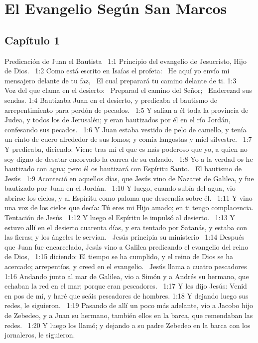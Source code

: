 \chapter{El Evangelio Según  San Marcos}
\section*{Capítulo 1}
Predicación de Juan el Bautista   
1:1 Principio del evangelio de Jesucristo, Hijo de Dios.  
1:2 Como está escrito en Isaías el profeta:  
He aquí yo envío mi mensajero delante de tu faz,  
El cual preparará tu camino delante de ti. 
1:3    Voz del que clama en el desierto:  
Preparad el camino del Señor;  
Enderezad sus sendas. 
1:4 Bautizaba Juan en el desierto, y predicaba el bautismo de arrepentimiento para perdón de pecados.  
1:5 Y salían a él toda la provincia de Judea, y todos los de Jerusalén; y eran bautizados por él en el río Jordán, confesando sus pecados.  
1:6 Y Juan estaba vestido de pelo de camello, y tenía un cinto de cuero alrededor de sus lomos;  y comía langostas y miel silvestre.  
1:7 Y predicaba, diciendo: Viene tras mí el que es más poderoso que yo, a quien no soy digno de desatar encorvado la correa de su calzado.  
1:8 Yo a la verdad os he bautizado con agua; pero él os bautizará con Espíritu Santo.  
El bautismo de Jesús  
1:9 Aconteció en aquellos días, que Jesús vino de Nazaret de Galilea, y fue bautizado por Juan en el Jordán.  
1:10 Y luego, cuando subía del agua, vio abrirse los cielos, y al Espíritu como paloma que descendía sobre él.  
1:11 Y vino una voz de los cielos que decía: Tú eres mi Hijo amado; en ti tengo complacencia. 
Tentación de Jesús  
1:12 Y luego el Espíritu le impulsó al desierto.  
1:13 Y estuvo allí en el desierto cuarenta días, y era tentado por Satanás, y estaba con las fieras; y los ángeles le servían.  
Jesús principia su ministerio   
1:14 Después que Juan fue encarcelado, Jesús vino a Galilea predicando el evangelio del reino de Dios,  
1:15 diciendo: El tiempo se ha cumplido, y el reino de Dios se ha acercado; arrepentíos, y creed en el evangelio.  
Jesús llama a cuatro pescadores   
1:16 Andando junto al mar de Galilea, vio a Simón y a Andrés su hermano, que echaban la red en el mar; porque eran pescadores.  
1:17 Y les dijo Jesús: Venid en pos de mí, y haré que seáis pescadores de hombres. 
1:18 Y dejando luego sus redes, le siguieron.  
1:19 Pasando de allí un poco más adelante, vio a Jacobo hijo de Zebedeo, y a Juan su hermano, también ellos en la barca, que remendaban las redes.  
1:20 Y luego los llamó; y dejando a su padre Zebedeo en la barca con los jornaleros, le siguieron.  
